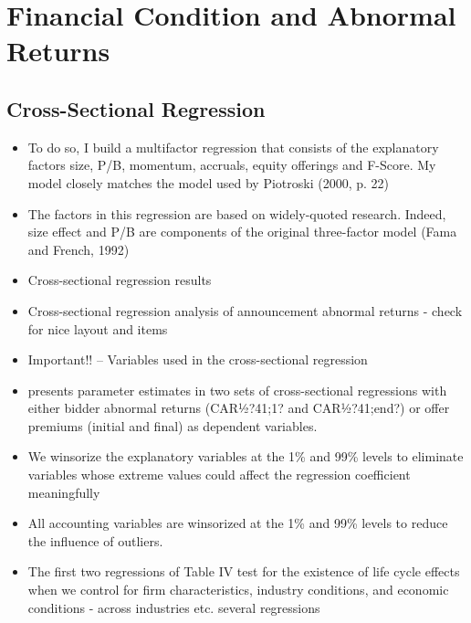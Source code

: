 \documentclass[12pt]{article}
\begin{document}
\section{Financial Condition and Abnormal Returns}
\subsection{Cross-Sectional Regression}

    \begin{itemize}
        \item To do so, I build a multifactor regression that consists of the explanatory factors size, P/B, momentum, accruals, equity offerings and F-Score. My model closely matches the model used by Piotroski (2000, p. 22) \citep{Mohr2012}

        \item The factors in this regression are based on widely-quoted research. Indeed, size effect and P/B are components of the original three-factor model (Fama and French, 1992) \citep{Mohr2012}

        \item Cross-sectional regression results \citep[p.3094]{Akhigbe2007}

        \item Cross-sectional regression analysis of announcement abnormal returns \citep{Moeller2004} - check for nice layout and items

        \item Important!! -- Variables used in the cross-sectional regression  \citep{Betton2009}

        \item presents parameter estimates in two sets of cross-sectional regressions with either bidder abnormal returns (CAR½?41;1? and CAR½?41;end?) or offer premiums (initial and final) as dependent variables. \citep{Betton2009}

        \item We winsorize the explanatory variables at the 1\% and 99\% levels to eliminate variables whose extreme values could affect the regression coefficient meaningfully \citep{Arikan2016}
        \item 
        All accounting variables are winsorized at the 1\% and 99\% levels to reduce the influence of outliers. \citep{Greenwood2009}
        \item The first two regressions of Table IV test for the existence of life cycle effects when we control for firm characteristics, industry conditions, and economic conditions \citep{Arikan2016} - across industries etc. several regressions


\end{itemize}
\end{document}
